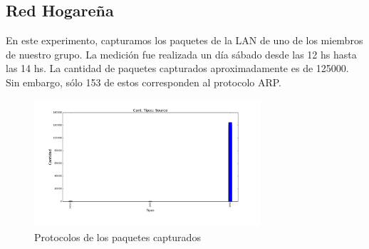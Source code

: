 \subsection{Red Hogareña}

En este experimento, capturamos los paquetes de la LAN de uno de los miembros de nuestro grupo. La medición fue realizada un día sábado desde las 12 hs hasta las 14 hs. La cantidad de paquetes capturados aproximadamente es de 125000. Sin embargo, sólo 153 de estos corresponden al protocolo ARP.

\begin{figure}[H]
       \centering
       \includegraphics[width=0.75\textwidth]{../resultados/Casa/Basename_Source_hist}
       \caption{Protocolos de los paquetes capturados}
       \label{red-hogarena-types}
\end{figure}

